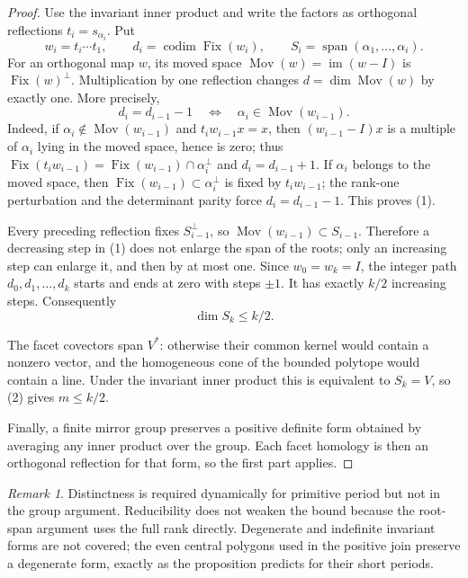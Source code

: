 \documentclass[11pt,a4paper]{article}
\theoremstyle{plain}
\theoremstyle{definition}
\theoremstyle{remark}
\newtheorem{remark}[theorem]{Remark}
\begin{document}
\begin{proof}
Use the invariant inner product and write the factors as orthogonal reflections
$t_i=s_{\alpha_i}$.  Put
\[
 w_i=t_i\cdots t_1,\qquad d_i=\operatorname{codim}\operatorname{Fix}(w_i),
 \qquad S_i=\operatorname{span}(\alpha_1,\ldots,\alpha_i).
\]
For an orthogonal map $w$, its moved space
$\operatorname{Mov}(w)=\operatorname{im}(w-I)$ is
$\operatorname{Fix}(w)^\perp$.  Multiplication by one reflection changes
$d=\dim\operatorname{Mov}(w)$ by exactly one.  More precisely,
\[
 d_i=d_{i-1}-1
 \quad\Longleftrightarrow\quad
 \alpha_i\in\operatorname{Mov}(w_{i-1}).               \tag{1}
\]
Indeed, if $\alpha_i\notin\operatorname{Mov}(w_{i-1})$ and
$t_iw_{i-1}x=x$, then
$(w_{i-1}-I)x$ is a multiple of $\alpha_i$ lying in the moved space, hence is
zero; thus
$\operatorname{Fix}(t_iw_{i-1})=\operatorname{Fix}(w_{i-1})\cap\alpha_i^\perp$
and $d_i=d_{i-1}+1$.  If $\alpha_i$ belongs to the moved space, then
$\operatorname{Fix}(w_{i-1})\subset\alpha_i^\perp$ is fixed by $t_iw_{i-1}$;
the rank-one perturbation and the determinant parity force
$d_i=d_{i-1}-1$.  This proves (1).

Every preceding reflection fixes $S_{i-1}^\perp$, so
$\operatorname{Mov}(w_{i-1})\subset S_{i-1}$.  Therefore a decreasing step in
(1) does not enlarge the span of the roots; only an increasing step can enlarge
it, and then by at most one.  Since $w_0=w_k=I$, the integer path
$d_0,d_1,\ldots,d_k$ starts and ends at zero with steps $\pm1$.  It has exactly
$k/2$ increasing steps.  Consequently
\[
                  \dim S_k\le k/2.                     \tag{2}
\]

The facet covectors span $V^*$: otherwise their common kernel would contain a
nonzero vector, and the homogeneous cone of the bounded polytope would contain a
line.  Under the invariant inner product this is equivalent to
$S_k=V$, so (2) gives $m\le k/2$.

Finally, a finite mirror group preserves a positive definite form obtained by
averaging any inner product over the group.  Each facet homology is then an
orthogonal reflection for that form, so the first part applies.
\end{proof}

\begin{remark}
Distinctness is required dynamically for primitive period but not in the group
argument.  Reducibility does not weaken the bound because the root-span argument
uses the full rank directly.  Degenerate and indefinite invariant forms are not
covered; the even central polygons used in the positive join preserve a degenerate
form, exactly as the proposition predicts for their short periods.
\end{remark}
\end{document}
